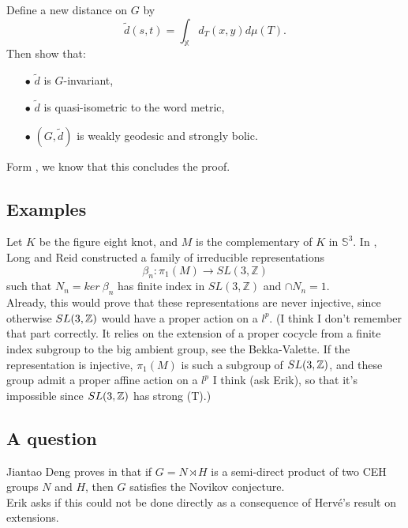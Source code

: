 Define a new distance on $G$ by
\[\tilde d (s,t) = \int_{\mathbb X} d_T(x,y) d\mu (T).\]
Then show that:
\begin{itemize}
\item[$\bullet$] $\tilde d$ is $G$-invariant,
\item[$\bullet$] $\tilde d$ is quasi-isometric to the word metric,
\item[$\bullet$] $(G,\tilde d)$ is weakly geodesic and strongly bolic.
\end{itemize}
Form \cite{mineyev2002baum}, we know that this concludes the proof.

\subsection{Examples}

Let $K$ be the figure eight knot, and $M$ is the complementary of $K$ in $\mathbb S^3$. In \cite{long2011small}, Long and Reid constructed a family of irreducible representations 
\[\beta_n : \pi_1 (M) \rightarrow SL(3,\mathbb Z)\]
such that $N_n = ker \ \beta_n $ has finite index in $SL(3,\mathbb Z)$ and $\cap N_n = 1$.\\

Already, this would prove that these representations are never injective, since otherwise $SL(3,\mathbb Z)$ would have a proper action on a $l^p$. (I think I don't remember that part correctly. It relies on the extension of a proper cocycle from a finite index subgroup to the big ambient group, see the Bekka-Valette. If the representation is injective, $\pi_1(M)$ is such a subgroup of $SL(3,\mathbb Z)$, and these group admit a proper affine action on a $l^p$ I think (ask Erik), so that it's impossible since $SL(3,\mathbb Z)$ has strong (T).)

\subsection{A question}

Jiantao Deng proves in \cite{} that if $G= N \rtimes H$ is a semi-direct product of two CEH groups $N$ and $H$, then $G$ satisfies the Novikov conjecture. \\

Erik asks if this could not be done directly as a consequence of Herv\'e's result on extensions. \\

